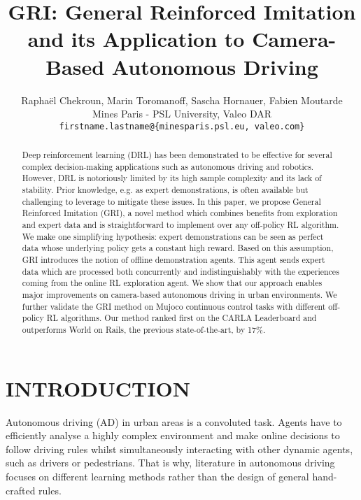 \documentclass[letterpaper, 10 pt, conference]{ieeeconf}
\begin{document}
\title{\LARGE \bf GRI: General Reinforced Imitation 
\\and its Application to Camera-Based Autonomous Driving}

\author{Raphaël Chekroun, Marin Toromanoff, Sascha Hornauer, Fabien Moutarde\\
Mines Paris - PSL University, Valeo DAR\\
\texttt{firstname.lastname@\{minesparis.psl.eu, valeo.com\}} 
}



\maketitle
\thispagestyle{empty}
\pagestyle{empty}




\begin{abstract}
    Deep reinforcement learning (DRL) has been demonstrated to be effective for several complex decision-making applications such as autonomous driving and robotics. However, DRL is notoriously limited by its high sample complexity and its lack of stability. Prior knowledge, e.g. as expert demonstrations, is often available but challenging to leverage to mitigate these issues. In this paper, we propose General Reinforced Imitation (GRI), a novel method which combines benefits from exploration and expert data and is straightforward to implement over any off-policy RL algorithm. We make one simplifying hypothesis: expert demonstrations can be seen as perfect data whose underlying policy gets a constant high reward. Based on this assumption, GRI introduces the notion of offline demonstration agents. This agent sends expert data which are processed both concurrently and indistinguishably with the experiences coming from the online RL exploration agent. We show that our approach enables major improvements on camera-based autonomous driving in urban environments. We further validate the GRI method on Mujoco continuous control tasks with different off-policy RL algorithms. Our method ranked first on the CARLA Leaderboard and outperforms World on Rails, the previous state-of-the-art, by 17\%.
\end{abstract}
\section{INTRODUCTION}
\label{sec:intro}


Autonomous driving (AD) in urban areas is a convoluted task. Agents have to efficiently analyse a highly complex environment and make online decisions to follow driving rules whilst simultaneously interacting with other dynamic agents, such as drivers or pedestrians. That is why, literature in autonomous driving focuses on different learning methods rather than the design of general hand-crafted rules.
\end{document}
